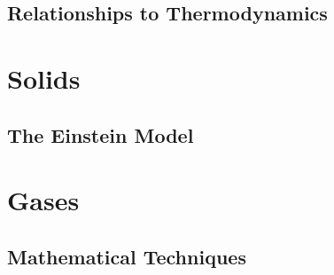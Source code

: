 \documentclass{momento}
\begin{document}


\chapter{Relationships to Thermodynamics}
\label{cha:relat-therm}



\part{Solids}
\label{part:solids}

\chapter{The Einstein Model}
\label{cha:einstein-model}

\part{Gases}
\label{part:gases}



\appendices

\chapter{Mathematical Techniques}
\label{cha:math-techn}


\end{document}
